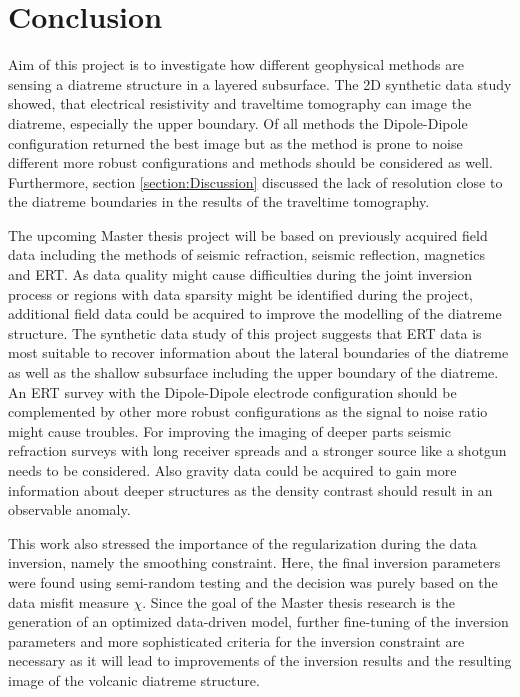 \section{Conclusion}\label{section:Conclusion}

Aim of this project is to investigate how different geophysical methods are sensing a diatreme structure in a layered subsurface. The 2D synthetic data study showed, that electrical resistivity and traveltime tomography can image the diatreme, especially the upper boundary. Of all methods the Dipole-Dipole configuration returned the best image but as the method is prone to noise different more robust configurations and methods should be considered as well. Furthermore, section \ref{section:Discussion} discussed the lack of resolution close to the diatreme boundaries in the results of the traveltime tomography. 

The upcoming Master thesis project will be based on previously acquired field data including the methods of seismic refraction, seismic reflection, magnetics and ERT. As data quality might cause difficulties during the joint inversion process or regions with data sparsity might be identified during the project, additional field data could be acquired to improve the modelling of the diatreme structure. The synthetic data study of this project suggests that ERT data is most suitable to recover information about the lateral boundaries of the diatreme as well as the shallow subsurface including the upper boundary of the diatreme. An ERT survey with the Dipole-Dipole electrode configuration should be complemented by other more robust configurations as the signal to noise ratio might cause troubles. For improving the imaging of deeper parts seismic refraction surveys with long receiver spreads and a stronger source like a shotgun needs to be considered. Also gravity data could be acquired to gain more information about deeper structures as the density contrast should result in an observable anomaly.

This work also stressed the importance of the regularization during the data inversion, namely the smoothing constraint. Here, the final inversion parameters were found using semi-random testing and the decision was purely based on the data misfit measure $\chi$. Since the goal of the Master thesis research is the generation of an optimized data-driven model, further fine-tuning of the inversion parameters and more sophisticated criteria for the inversion constraint are necessary as it will lead to improvements of the inversion results and the resulting image of the volcanic diatreme structure.
